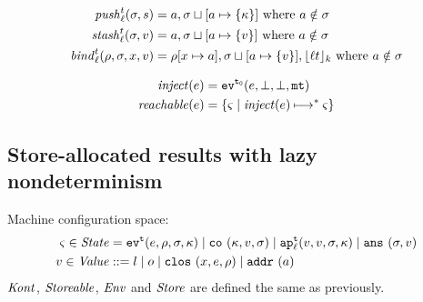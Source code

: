 \documentclass{llncs}
\newcommand{\inject}{\mathit{inject}}
\newcommand{\setof}[1]{\{ #1 \}}
\newcommand{\alt}{\mid}
\begin{document}
\begin{align*}
\mathit{push}_{\ell}^{t}(\sigma,s) &= a,\sigma\sqcup[a\mapsto\{\kappa\}]
\mbox{ where }a \notin\sigma
\\
\mathit{stash}_{\ell}^{t}(\sigma,v) &= a,\sigma\sqcup[a\mapsto\{v\}]
\mbox{ where }a \notin\sigma
\\
\mathit{bind}_{\ell}^{t}(\rho,\sigma,x,v) &= \rho[x\mapsto a],\sigma\sqcup[a\mapsto\{v\}],\lfloor {\ell}{t} \rfloor_k
\mbox{ where }a \notin\sigma
\end{align*}

\begin{align*}
\inject(\mexp) &= \ev[^\mtcntr]{\mexp,\bot,\bot,\kmt} \\
\reachable{\mexp} &= \setof{\mstate \mid \inject(\mexp) \machstep^* \mstate}
\end{align*}

\subsection{Store-allocated results with lazy nondeterminism}

Machine configuration space:
\begin{align*}
\mstate \in \State &= \ev[^\mcntr]{\mexp, \menv, \msto, \mkont} \alt
                     \co{\mkont, \mval, \msto} \alt
                     \ap[_\mlab^\mcntr]{\mval,\mval,\msto,\mkont} \alt
                     \ans{\msto,\mval}\\
\mval \in \Value &::= \mlit \alt \mop \alt
                      \clos{\mvar,\mexp,\menv} \alt
                      \saddr\maddr
\end{align*}
$\mathit{Kont}$, $\mathit{Storeable}$, $\mathit{Env}$ and $\mathit{Store}$ are defined the same as previously.
\end{document}
